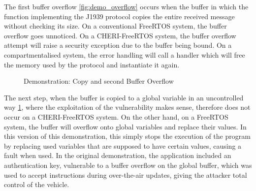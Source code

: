 \documentclass[a4paper, 11pt]{article}
\begin{document}
The first buffer overflow \ref{fig:demo_overflow} occurs when the buffer in which the function implementing the J1939 protocol copies the entire received message without checking its size. On a conventional FreeRTOS system, the buffer overflow goes unnoticed.
On a CHERI-FreeRTOS system, the buffer overflow attempt will raise a security exception due to the buffer being bound. On a compartmentalised system, the error handling will call a handler which will free the memory used by the protocol and instantiate it again.
\begin{figure}
        \begin{center}
        \end{center}
        \caption{Demonstration: Copy and second Buffer Overflow} 
		\label{fig:demo_copy}

\end{figure}
The next step, when the buffer is copied to a global variable in an uncontrolled way \ref{fig:demo_copy}, where the exploitation of the vulnerability makes sense, therefore does not occur on a CHERI-FreeRTOS system. On the other hand, on a FreeRTOS system, the buffer will overflow onto global variables and replace their values. In this version of this demonstration, this simply stops the execution of the program by replacing used variables that are supposed to have certain values, causing a fault when used. In the original demonstration, the application included an authentication key, vulnerable to a buffer overflow on the global buffer, which was used to accept instructions during over-the-air updates, giving the attacker total control of the vehicle. 
\newcommand{\threeRect}[5]{
        \draw (#1,#2) rectangle (#1+5,#2+1);
        \draw (#1,#2+1) rectangle (#1+5,#2+2);
        \draw (#1,#2+2) rectangle (#1+5,#2+3);
        \node at (#1+2.5,0.5) {#3};
        \node at (#1+2.5,1.5) {#4};
        \node at (#1+2.5,2.5) {#5};
}
\end{document}
